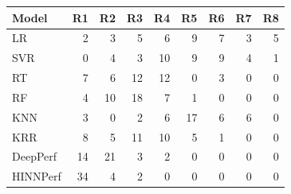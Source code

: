\begin{tabular}{lrrrrrrrr}
\toprule
Model & R1 & R2 & R3 & R4 & R5 & R6 & R7 & R8 \\
\midrule
LR & 2 & 3 & 5 & 6 & 9 & 7 & 3 & 5 \\
SVR & 0 & 4 & 3 & 10 & 9 & 9 & 4 & 1 \\
RT & 7 & 6 & 12 & 12 & 0 & 3 & 0 & 0 \\
RF & 4 & 10 & 18 & 7 & 1 & 0 & 0 & 0 \\
KNN & 3 & 0 & 2 & 6 & 17 & 6 & 6 & 0 \\
KRR & 8 & 5 & 11 & 10 & 5 & 1 & 0 & 0 \\
DeepPerf & 14 & 21 & 3 & 2 & 0 & 0 & 0 & 0 \\
HINNPerf & 34 & 4 & 2 & 0 & 0 & 0 & 0 & 0 \\
\bottomrule
\end{tabular}
